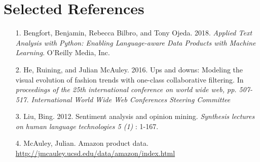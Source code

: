 \documentclass[a4paper,12pt]{article}
\begin{document}
\section*{Selected References}
\begin{enumerate}
\item[1.] Bengfort, Benjamin, Rebecca Bilbro, and Tony Ojeda. 2018. \textit{Applied Text Analysis with Python: Enabling Language-aware Data Products with Machine Learning}. O'Reilly Media, Inc.
\item[2.] He, Ruining, and Julian McAuley. 2016. Ups and downs: Modeling the visual evolution of fashion trends with one-class collaborative filtering. In \textit{proceedings of the 25th international conference on world wide web, pp. 507-517. International World Wide Web Conferences Steering Committee}
\item[3.] Liu, Bing. 2012. Sentiment analysis and opinion mining. \textit{Synthesis lectures on human language technologies 5 (1)} : 1-167.
\item [4.] McAuley, Julian. Amazon product data. \href{http://jmcauley.ucsd.edu/data/amazon/index.html}{http://jmcauley.ucsd.edu/data/amazon/index.html}

\end{enumerate}
\end{document}
